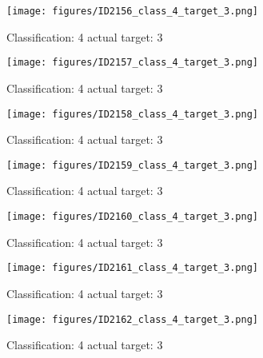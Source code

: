 \begin{figure}[h!]
\begin{center}
\texttt{[image: figures/ID2156\_class\_4\_target\_3.png]}
\end{center}
\caption{ Classification: 4 actual target: 3}
\label{fig:ID2156_class_4_target_3}
\end{figure}
\begin{figure}[h!]
\begin{center}
\texttt{[image: figures/ID2157\_class\_4\_target\_3.png]}
\end{center}
\caption{ Classification: 4 actual target: 3}
\label{fig:ID2157_class_4_target_3}
\end{figure}
\begin{figure}[h!]
\begin{center}
\texttt{[image: figures/ID2158\_class\_4\_target\_3.png]}
\end{center}
\caption{ Classification: 4 actual target: 3}
\label{fig:ID2158_class_4_target_3}
\end{figure}
\begin{figure}[h!]
\begin{center}
\texttt{[image: figures/ID2159\_class\_4\_target\_3.png]}
\end{center}
\caption{ Classification: 4 actual target: 3}
\label{fig:ID2159_class_4_target_3}
\end{figure}
\begin{figure}[h!]
\begin{center}
\texttt{[image: figures/ID2160\_class\_4\_target\_3.png]}
\end{center}
\caption{ Classification: 4 actual target: 3}
\label{fig:ID2160_class_4_target_3}
\end{figure}
\begin{figure}[h!]
\begin{center}
\texttt{[image: figures/ID2161\_class\_4\_target\_3.png]}
\end{center}
\caption{ Classification: 4 actual target: 3}
\label{fig:ID2161_class_4_target_3}
\end{figure}
\begin{figure}[h!]
\begin{center}
\texttt{[image: figures/ID2162\_class\_4\_target\_3.png]}
\end{center}
\caption{ Classification: 4 actual target: 3}
\label{fig:ID2162_class_4_target_3}
\end{figure}
